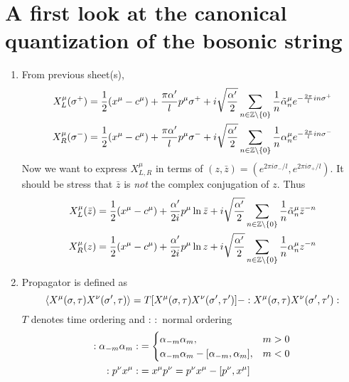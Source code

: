 \section{A first look at the canonical quantization of the bosonic string}

\begin{enumerate}[label=(\alph*)]
	\item From previous sheet(s),
		\begin{align}
			X_L^\mu (\sigma^+) &= \frac{1}{2} (x^\mu - c^\mu) + \frac{\pi \alpha'}{l} p^\mu \sigma^+ + i \sqrt{\frac{\alpha'}{2}} \sum_{n \in \mathbb{Z} \setminus \{0\}} \frac{1}{n} \tilde{\alpha}_n^\mu e^{-\frac{2\pi}{l} i n \sigma^+} \\
			X_R^\mu (\sigma^-) &= \frac{1}{2} (x^\mu - c^\mu) + \frac{\pi \alpha'}{l} p^\mu \sigma^- + i \sqrt{\frac{\alpha'}{2}} \sum_{n \in \mathbb{Z} \setminus \{0\}} \frac{1}{n} {\alpha}_n^\mu e^{-\frac{2\pi}{l} i n \sigma^-}
		\end{align}
		Now we want to express $X_{L,R}^\mu$ in terms of $(z,\bar{z}) = (e^{2\pi i \sigma_- /l}, e^{2\pi i \sigma_+ / l})$. It should be stress that $\bar{z}$ is \textit{not} the complex conjugation of $z$. Thus
		\begin{align}
			X_L^\mu (\bar{z}) &= \frac{1}{2} (x^\mu - c^\mu) + \frac{\alpha'}{2i} p^\mu \ln\bar{z} + i \sqrt{\frac{\alpha'}{2}} \sum_{n \in \mathbb{Z} \setminus \{0\}} \frac{1}{n} \tilde{\alpha}_n^\mu {\bar{z}}^{-n} \\
			X_R^\mu (z) &= \frac{1}{2} (x^\mu - c^\mu) + \frac{\alpha'}{2i} p^\mu \ln z + i \sqrt{\frac{\alpha'}{2}} \sum_{n \in \mathbb{Z} \setminus \{0\}} \frac{1}{n} {\alpha}_n^\mu z^{-n}
		\end{align}

	\item Propagator is defined as
		\begin{equation}
			\braket{X^\mu(\sigma,\tau) X^\nu (\sigma', \tau)} = T[X^\mu(\sigma,\tau) X^\nu (\sigma', \tau')] - :X^\mu(\sigma,\tau) X^\nu (\sigma',\tau'):
		\end{equation}
		$T$ denotes time ordering and $: \, :$ normal ordering
		\begin{align*}
			:\alpha_{-m} \alpha_{m}: &= 
			\begin{cases}
				\alpha_{-m} \alpha_{m}, & m>0 \\ 
				\alpha_{-m} \alpha_{m} - \comm{\alpha_{-m}}{\alpha_{m}}, & m < 0 \\
			\end{cases} \\
			:p^\nu x^\mu: &= x^\mu p^\nu = p^\nu x^\mu - \comm{p^\nu}{x^\mu}
		\end{align*}


\end{enumerate}
